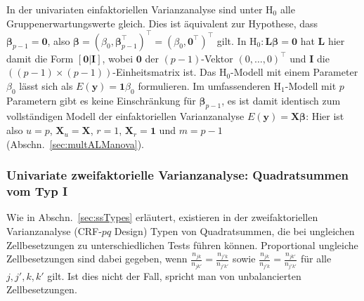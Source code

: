 In der univariaten einfaktoriellen Varianzanalyse sind unter $\text{H}_{0}$ alle Gruppenerwartungswerte gleich. Dies ist äquivalent zur Hypothese, dass $\bm{\beta}_{p-1} = \bm{0}$, also $\bm{\beta} = (\beta_{0}, \bm{\beta}_{p-1}^{\top})^{\top} = (\beta_{0}, \bm{0}^{\top})^{\top}$ gilt. In $\text{H}_{0}: \bm{L} \bm{\beta} = \bm{0}$ hat $\bm{L}$ hier damit die Form $[\bm{0} | \bm{I}]$, wobei $\bm{0}$ der $(p-1)$-Vektor $(0, \ldots, 0)^{\top}$ und $\bm{I}$ die $((p-1) \times (p-1))$-Einheitsmatrix ist. Das $\text{H}_{0}$-Modell mit einem Parameter $\beta_{0}$ lässt sich als $E(\bm{y}) = \bm{1} \beta_{0}$ formulieren. Im umfassenderen $\text{H}_{1}$-Modell mit $p$ Parametern gibt es keine Einschränkung für $\bm{\beta}_{p-1}$, es ist damit identisch zum vollständigen Modell der einfaktoriellen Varianzanalyse $E(\bm{y}) = \bm{X} \bm{\beta}$: Hier ist also $u=p$, $\bm{X}_{u} = \bm{X}$, $r=1$, $\bm{X}_{r} = \bm{1}$ und $m = p-1$ (Abschn.\ \ref{sec:multALManova}).

\subsubsection{Univariate zweifaktorielle Varianzanalyse: Quadratsummen vom Typ I}

Wie in Abschn.\ \ref{sec:ssTypes} erläutert, existieren in der zweifaktoriellen Varianzanalyse (CRF-$pq$ Design) Typen von Quadratsummen, die bei ungleichen Zellbesetzungen zu unterschiedlichen Tests führen können. Proportional ungleiche Zellbesetzungen sind dabei gegeben, wenn $\frac{n_{jk}}{n_{jk'}} = \frac{n_{j'k}}{n_{j'k'}}$ sowie $\frac{n_{jk}}{n_{j'k}} = \frac{n_{jk'}}{n_{j'k'}}$ für alle $j, j', k, k'$ gilt. Ist dies nicht der Fall, spricht man von unbalancierten Zellbesetzungen.

